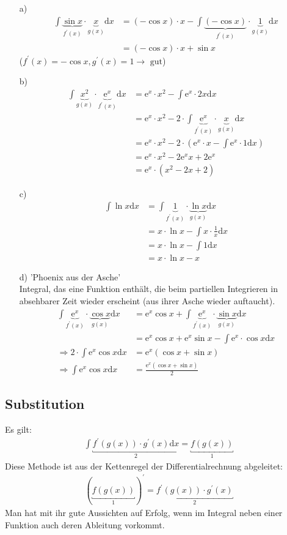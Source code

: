 \documentclass[12pt, titlepage]{article}
\newcommand{\e}{\textrm{e}}
\renewcommand{\>}{\rightarrow}
\renewcommand{\*}{\cdot}
\begin{document}
	\begin{itemize}
		\item[a)] \begin{align*}
		\int\underbrace{\sin x}_{f^\prime(x)}\*\underbrace{x}_{g(x)}\textrm{d}x&=(-\cos x)\*x-\int\underbrace{(-\cos x)}_{f^\prime(x)}\*\underbrace{1}_{g(x)}\textrm{d}x\\
		&=(-\cos x)\*x+\sin x
		\end{align*}
		($f^\prime(x)=-\cos x, g^\prime(x)=1\>\textrm{ gut}$)
		\item[b)] \begin{align*}
			\int\underbrace{x^2}_{g(x)}\*\underbrace{\e^x}_{f^\prime(x)}\textrm{d}x&=\e^x\*x^2-\int\e^x\*2x\textrm{d}x\\
			&=\e^x\*x^2-2\*\int\underbrace{\e^x}_{f^\prime(x)}\*\underbrace{x}_{g(x)}\textrm{d}x\\
			&=\e^x\*x^2-2\*(\e^x\*x-\int\e^x\*1\textrm{d}x)\\
			&=\e^x\*x^2-2\e^xx+2\e^x\\
			&=\e^x\*(x^2-2x+2)
		\end{align*}
		\item[c)] \begin{align*}
			\int\ln x\textrm{d}x&=\int\underbrace{1}_{f^\prime(x)}\*\underbrace{\ln x}_{g(x)}\textrm{d}x\\
			&=x\*\ln x-\int x\*\frac{1}{x}\textrm{d}x\\
			&=x\*\ln x-\int 1\textrm{d}x\\
			&=x\*\ln x-x
		\end{align*}
		\item[d)] 'Phoenix aus der Asche'\\
		Integral, das eine Funktion enthält, die beim partiellen Integrieren in absehbarer Zeit wieder erscheint (aus ihrer Asche wieder auftaucht).
		\begin{align*}
			\int\underbrace{\e^x}_{f^\prime(x)}\*\underbrace{\cos x}_{g(x)}\textrm{d}x&=\e^x\cos x+\int\underbrace{\e^x}_{f^\prime(x)}\*\underbrace{\sin x}_{g(x)}\textrm{d}x\\
			&=\e^x\cos x+\e^x\sin x-\int\e^x\*\cos x\textrm{d}x\\
			\Rightarrow2\*\int\e^x\cos x\textrm{d}x&=\e^x(\cos x+\sin x)\\
			\Rightarrow \int\e^x\cos x\textrm{d}x&=\frac{\e^x(\cos x+\sin x)}{2}
		\end{align*}
	\end{itemize}
	\subsection{Substitution}
	Es gilt:
	\begin{align*}
		\int\underbracket{f^\prime(g(x))\*g^\prime(x)\textrm{d}x}_{2}=\underbracket{f(g(x))}_{1}
	\end{align*}
	Diese Methode ist aus der Kettenregel der Differentialrechnung abgeleitet:
	\begin{align*}
		(\underbracket{f(g(x))}_{1})^\prime=\underbracket{f^\prime(g(x))\*g^\prime(x)}_{2}
	\end{align*}
	Man hat mit ihr gute Aussichten auf Erfolg, wenn im Integral neben einer Funktion auch deren Ableitung vorkommt.
\end{document}
